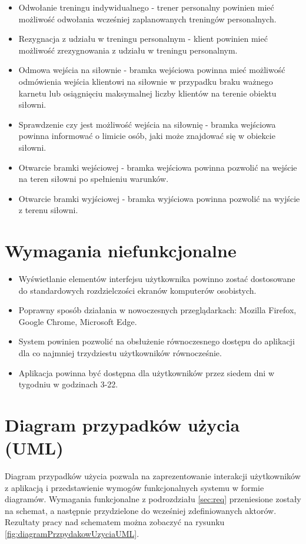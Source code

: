 \documentclass[a4paper,twoside,12pt]{book}
\begin{document}
\begin{itemize}
			\item Odwołanie treningu indywidualnego - trener personalny powinien mieć możliwość odwołania wcześniej zaplanowanych treningów personalnych.
			\item Rezygnacja z udziału w treningu personalnym - klient powinien mieć możliwość zrezygnowania z udziału w treningu personalnym.
			\item Odmowa wejścia na siłownie - bramka wejściowa powinna mieć możliwość odmówienia wejścia klientowi na siłownie w przypadku braku ważnego karnetu lub osiągnięciu maksymalnej liczby klientów na terenie obiektu siłowni.
			\item Sprawdzenie czy jest możliwość wejścia na siłownię - bramka wejściowa powinna informować o limicie osób, jaki może znajdować się w obiekcie siłowni.
			\item Otwarcie bramki wejściowej - bramka wejściowa powinna pozwolić na wejście na teren siłowni po spełnieniu warunków.
			\item Otwarcie bramki wyjściowej - bramka wyjściowa powinna pozwolić na wyjście z terenu siłowni.
		\end{itemize}
			
	\section {Wymagania niefunkcjonalne}
		\begin {itemize}
			\item Wyświetlanie elementów interfejsu użytkownika powinno zostać dostosowane do standardowych rozdzielczości ekranów komputerów osobistych.
			\item Poprawny sposób działania w nowoczesnych przeglądarkach: Mozilla Firefox, Google Chrome, Microsoft Edge.
			\item System powinien pozwolić na obsłużenie równoczesnego dostępu do aplikacji dla co najmniej trzydziestu użytkowników równocześnie.
			\item Aplikacja powinna być dostępna dla użytkowników przez siedem dni w tygodniu w godzinach 3-22.
		\end{itemize}
	
	\section {Diagram przypadków użycia (UML)}
	Diagram przypadków użycia pozwala na zaprezentowanie interakcji użytkowników z aplikacją i przedstawienie wymogów funkcjonalnych systemu w formie diagramów. Wymagania funkcjonalne z podrozdziału \ref{sec:req} przeniesione zostały na schemat, a następnie przydzielone do wcześniej zdefiniowanych aktorów. Rezultaty pracy nad schematem można zobaczyć na rysunku \ref{fig:diagramPrzpydakowUzyciaUML}.
	
\end{document}

